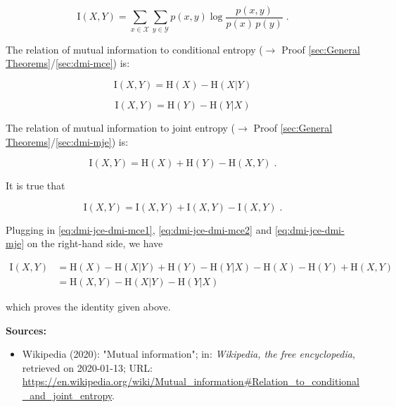 \documentclass[a4paper,12pt]{book}
\begin{document}
\begin{equation} \label{eq:dmi-jce-MI}
\mathrm{I}(X,Y) = \sum_{x \in \mathcal{X}} \sum_{y \in \mathcal{Y}} p(x,y) \log \frac{p(x,y)}{p(x)\,p(y)} \; .
\end{equation}

The relation of mutual information to conditional entropy ($\rightarrow$ Proof \ref{sec:General Theorems}/\ref{sec:dmi-mce}) is:

\begin{equation} \label{eq:dmi-jce-dmi-mce1}
\mathrm{I}(X,Y) = \mathrm{H}(X) - \mathrm{H}(X|Y)
\end{equation}

\begin{equation} \label{eq:dmi-jce-dmi-mce2}
\mathrm{I}(X,Y) = \mathrm{H}(Y) - \mathrm{H}(Y|X)
\end{equation}

The relation of mutual information to joint entropy ($\rightarrow$ Proof \ref{sec:General Theorems}/\ref{sec:dmi-mje}) is:

\begin{equation} \label{eq:dmi-jce-dmi-mje}
\mathrm{I}(X,Y) = \mathrm{H}(X) + \mathrm{H}(Y) - \mathrm{H}(X,Y) \; .
\end{equation}

It is true that

\begin{equation} \label{eq:dmi-jce-MI-s1}
\mathrm{I}(X,Y) = \mathrm{I}(X,Y) + \mathrm{I}(X,Y) - \mathrm{I}(X,Y) \; .
\end{equation}

Plugging in \eqref{eq:dmi-jce-dmi-mce1}, \eqref{eq:dmi-jce-dmi-mce2} and \eqref{eq:dmi-jce-dmi-mje} on the right-hand side, we have

\begin{equation} \label{eq:dmi-jce-MI-s2}
\begin{split}
\mathrm{I}(X,Y) &= \mathrm{H}(X) - \mathrm{H}(X|Y) + \mathrm{H}(Y) - \mathrm{H}(Y|X) - \mathrm{H}(X) - \mathrm{H}(Y) + \mathrm{H}(X,Y) \\
&= \mathrm{H}(X,Y) - \mathrm{H}(X|Y) - \mathrm{H}(Y|X)
\end{split}
\end{equation}

which proves the identity given above.

\vspace{1em}
\textbf{Sources:}
\begin{itemize}
\item Wikipedia (2020): "Mutual information"; in: \textit{Wikipedia, the free encyclopedia}, retrieved on 2020-01-13; URL: \url{https://en.wikipedia.org/wiki/Mutual_information#Relation_to_conditional_and_joint_entropy}.
\end{itemize}
\end{document}
